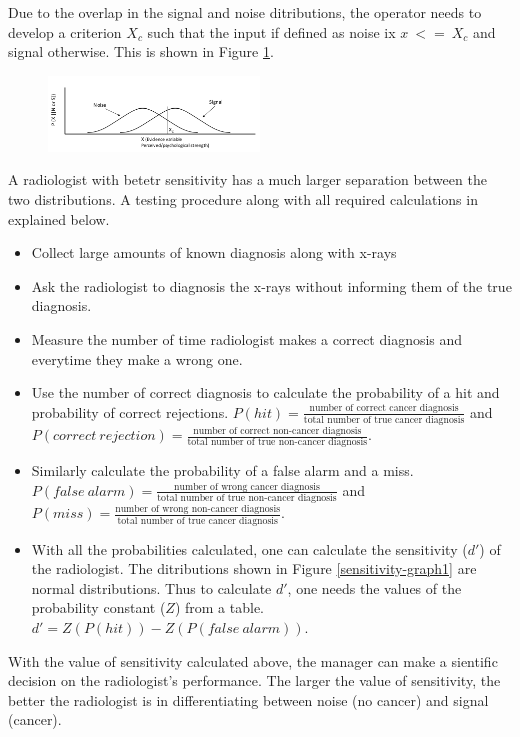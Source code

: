 \documentclass[12pt]{article}
\begin{document}
	Due to the overlap in the signal and noise ditributions, the operator needs to develop a criterion $X_c$ such that the input if defined as noise ix $x\ <=\ X_c$ and signal otherwise. This is shown in Figure \ref{graph2}.
	
	\begin{figure}[!ht]
		\centering
		\includegraphics[width=0.5\textwidth]{graph2}
		\caption{}
		\label{graph2}
	\end{figure}
	
	A radiologist with betetr sensitivity has a much larger separation between the two distributions. A testing procedure along with all required calculations in explained below.
	
	\begin{itemize}
		\item Collect large amounts of known diagnosis along with x-rays
		\item Ask the radiologist to diagnosis the x-rays without informing them of the true diagnosis.
		\item Measure the number of time radiologist makes a correct diagnosis and everytime they make a wrong one.
		\item Use the number of correct diagnosis to calculate the probability of a hit and probability of correct rejections. $P(hit)=\frac{\text{number of correct cancer diagnosis}}{\text{total number of true cancer diagnosis}}$ and $P(correct\ rejection)=\frac{\text{number of correct non-cancer diagnosis}}{\text{total number of true non-cancer diagnosis}}$.
		\item Similarly calculate the probability of a false alarm and a miss. $P(false\ alarm)=\frac{\text{number of wrong cancer diagnosis}}{\text{total number of true non-cancer diagnosis}}$ and $P(miss)=\frac{\text{number of wrong non-cancer diagnosis}}{\text{total number of true cancer diagnosis}}$.
		\item With all the probabilities calculated, one can calculate the sensitivity ($d'$) of the radiologist. The ditributions shown in Figure \ref{sensitivity-graph1} are normal distributions. Thus to calculate $d'$, one needs the values of the probability constant ($Z$) from a table. $d'=Z(P(hit))-Z(P(false\ alarm))$.
	\end{itemize}	 
	
	With the value of sensitivity calculated above, the manager can make a sientific decision on the radiologist's performance. The larger the value of sensitivity, the better the radiologist is in differentiating between noise (no cancer) and signal (cancer).
	
	
\end{document}
